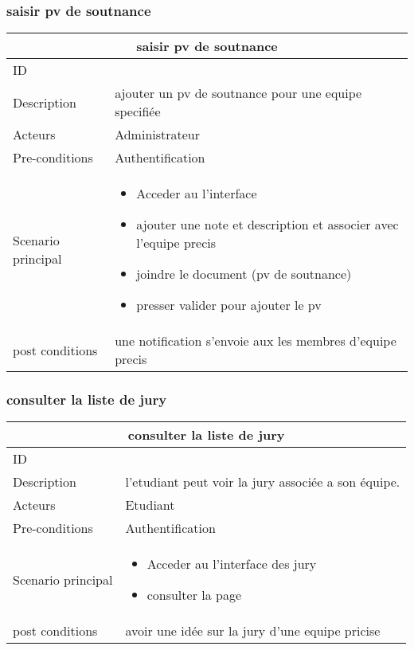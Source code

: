 \documentclass[11pt,fleqn]{book} %
\begin{document}
\subsubsection{saisir pv de soutnance}
\begin{center}
\begin{tabularx}{1\textwidth} { | p{4cm} | >{\raggedright\arraybackslash}X |  }
  \hline
  \multicolumn{2}{|c|}{saisir pv de soutnance} \\
 \hline
 ID & 4  \\
 \hline
 Description  & ajouter un pv de soutnance pour une equipe specifiée   \\
  \hline
 Acteurs  & Administrateur   \\
  \hline
 Pre-conditions  & Authentification\\
 \hline
 Scenario principal  &  
 \begin{itemize}
     \item  Acceder au l'interface 
     \item ajouter une note et description et associer avec l'equipe precis
     \item joindre le document (pv de soutnance)
     \item presser valider pour ajouter le pv

 \end{itemize}\\
  \hline
 post conditions  & une notification s'envoie aux les membres d'equipe precis \\
  \hline
\end{tabularx}
\label{tbl:nicetablelesstable}
\end{center}
\subsubsection{consulter la liste de jury}
\begin{center}
\begin{tabularx}{1\textwidth} { | p{4cm} | >{\raggedright\arraybackslash}X |  }
  \hline
  \multicolumn{2}{|c|}{consulter la liste de jury} \\
 \hline
 ID & 5  \\
 \hline
 Description  &  l'etudiant peut voir la jury associée a son équipe.  \\
  \hline
 Acteurs  & Etudiant\\
  \hline
 Pre-conditions  & Authentification\\
 \hline
 Scenario principal  &  
 \begin{itemize}
     \item  Acceder au l'interface des jury 
     \item consulter la page
 \end{itemize}\\
  \hline
 post conditions  & avoir une idée sur la jury d'une equipe pricise \\
  \hline
\end{tabularx}
\label{tbl:nicetablelesstable}
\end{center}
\end{document}
